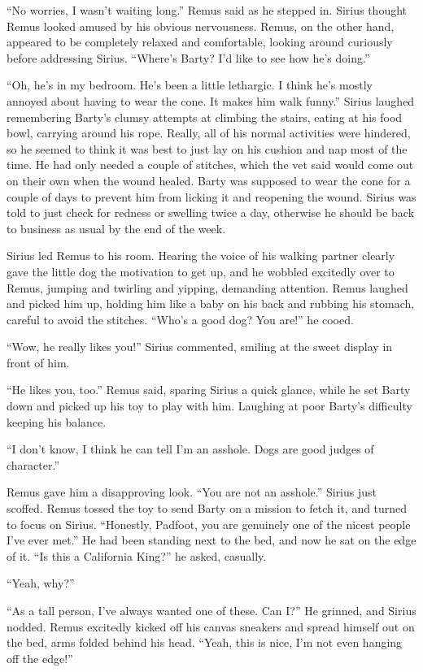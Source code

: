 \documentclass[12pt,twoside,openright]{memoir}
\begin{document}
``No worries, I wasn't waiting long.'' Remus said as he stepped in. Sirius thought Remus looked amused by his obvious nervousness. Remus, on the other hand, appeared to be completely relaxed and comfortable, looking around curiously before addressing Sirius. ``Where's Barty? I'd like to see how he's doing.''

``Oh, he's in my bedroom. He's been a little lethargic. I think he's mostly annoyed about having to wear the cone. It makes him walk funny.'' Sirius laughed remembering Barty's clumsy attempts at climbing the stairs, eating at his food bowl, carrying around his rope. Really, all of his normal activities were hindered, so he seemed to think it was best to just lay on his cushion and nap most of the time. He had only needed a couple of stitches, which the vet said would come out on their own when the wound healed. Barty was supposed to wear the cone for a couple of days to prevent him from licking it and reopening the wound. Sirius was told to just check for redness or swelling twice a day, otherwise he should be back to business as usual by the end of the week.

Sirius led Remus to his room. Hearing the voice of his walking partner clearly gave the little dog the motivation to get up, and he wobbled excitedly over to Remus, jumping and twirling and yipping, demanding attention. Remus laughed and picked him up, holding him like a baby on his back and rubbing his stomach, careful to avoid the stitches. ``Who's a good dog? You are!'' he cooed.

``Wow, he really likes you!'' Sirius commented, smiling at the sweet display in front of him.

``He likes you, too.'' Remus said, sparing Sirius a quick glance, while he set Barty down and picked up his toy to play with him. Laughing at poor Barty's difficulty keeping his balance.

``I don't know, I think he can tell I'm an asshole. Dogs are good judges of character.''

Remus gave him a disapproving look. ``You are not an asshole.'' Sirius just scoffed. Remus tossed the toy to send Barty on a mission to fetch it, and turned to focus on Sirius. ``Honestly, Padfoot, you are genuinely one of the nicest people I've ever met.'' He had been standing next to the bed, and now he sat on the edge of it. ``Is this a California King?'' he asked, casually.

``Yeah, why?''

``As a tall person, I've always wanted one of these. Can I?'' He grinned, and Sirius nodded. Remus excitedly kicked off his canvas sneakers and spread himself out on the bed, arms folded behind his head. ``Yeah, this is nice, I'm not even hanging off the edge!''
\end{document}
